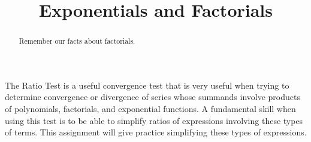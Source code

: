\documentclass{ximera}
\title[Refresh:]{Exponentials and Factorials}
\begin{document}
\begin{abstract}
  Remember our facts about factorials.
\end{abstract}
\maketitle

\begin{exercise}
The Ratio Test is a useful convergence test that is very useful when trying to determine convergence or divergence of series whose summands involve products of polynomials, factorials, and exponential functions. A fundamental skill when using this test is to be able to simplify ratios of expressions involving these types of terms.  This assignment will give practice simplifying these types of expressions.


\begin{multipleChoice}
\end{multipleChoice}
\end{exercise}
\end{document}
